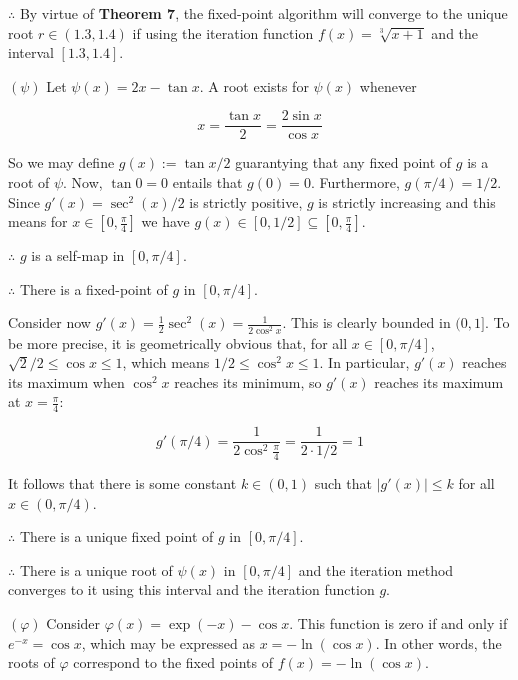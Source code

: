 \documentclass[12pt]{article}
\theoremstyle{definition}
\begin{document}
$\therefore $ By virtue of \textbf{Theorem 7}, the fixed-point algorithm will
converge to the unique root $r \in (1.3, 1.4)$ if using the iteration function
$f(x) = \sqrt[3]{x+1} $ and the interval $[1.3, 1.4]$.

\pagebreak 

$(\psi)$ Let $\psi(x) = 2x - \tan x$. A root exists for $\psi(x)$ whenever 

\begin{equation*}
    x = \frac{\tan x}{2} = \frac{2 \sin x}{\cos x}
\end{equation*}

So we may define $g(x) := \tan x / 2$ guarantying that any fixed point of $g$ is
a root of $\psi$. Now, $\tan 0 = 0$ entails that $g(0) = 0$. 
Furthermore, $g(\pi / 4) = 1  /2$. Since $g'(x) = \sec^2(x) / 2$ is strictly
positive, $g$ is strictly increasing and this means for $x \in [0,
\frac{\pi}{4}]$ we have $g(x) \in [0, 1 / 2] \subseteq [0, \frac{\pi}{4}]$.

$\therefore $ $g$ is a self-map in $[0, \pi / 4]$.

$\therefore $ There is a fixed-point of $g$ in $[0, \pi / 4]$.

Consider now $g'(x) = \frac{1}{2}\sec^2(x)  = \frac{1}{2\cos^2 x}$. This is
clearly bounded in $(0, 1]$. To be more precise, it is geometrically obvious
that, for all $x \in [0, \pi / 4]$, $\sqrt{2} / 2 \leq \cos x \leq 1$, which
means $1/2 \leq \cos^2 x \leq 1$. In particular, $g'(x)$ reaches its maximum
when $\cos^2 x$ reaches its minimum, so $g'(x)$ reaches its maximum at $x =
\frac{\pi}{4}$: 

\begin{equation*}
    g'(\pi / 4) = \frac{1}{2\cos^2 \frac{\pi}{4}} = \frac{1}{2 \cdot 1 / 2} = 1
\end{equation*}

It follows that there is some constant $k \in (0, 1)$ such that $|g'(x)| \leq k$
for all $x \in (0, \pi / 4)$.

$\therefore $ There is a unique fixed point of $g$ in $[0, \pi / 4]$.

$\therefore $ There is a unique root of $\psi(x)$ in $[0, \pi / 4]$ and the
iteration method converges to it using this interval and the iteration function
$g$.


\pagebreak 

$(\varphi)$ Consider $\varphi(x) = \exp(-x) - \cos x$. This function is zero if
and only if $e^{-x} = \cos x$, which may be expressed as $x = -\ln \left( \cos x
\right) $. In other words, the roots of $\varphi$ correspond to the fixed points
of $f(x) = - \ln(\cos x)$. 
\end{document}
